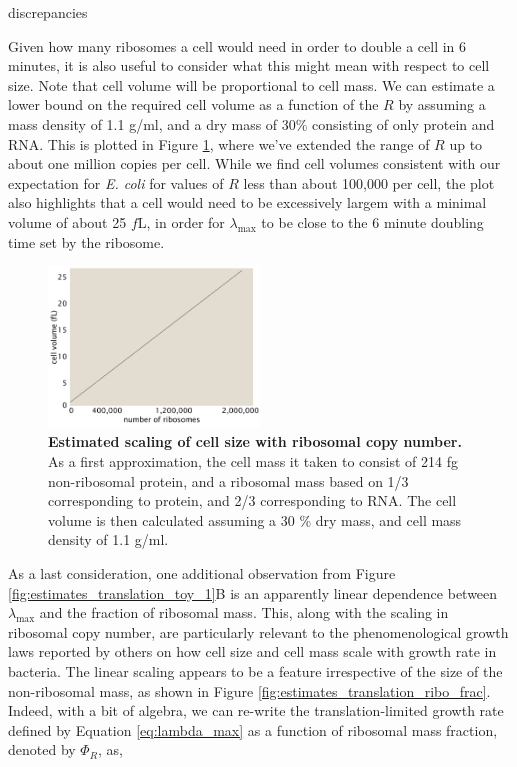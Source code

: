 discrepancies \documentclass[11pt, letterpaper]{article}
\begin{document}
Given how many ribosomes a cell would need in order to double a cell in 6 minutes,
it is also useful to consider what this might mean with
respect to cell size. Note that cell volume will be proportional to cell mass.
We can estimate a lower bound on the required cell volume as a function of the
$R$ by assuming a mass density of 1.1 g/ml, and a dry mass of 30\% consisting of
only protein and RNA. This is plotted in Figure
\ref{fig:estimates_translation_volume}, where we've extended the range of $R$ up
to about one million copies per cell. While we find cell volumes consistent with our expectation for {\it E. coli}
for values of $R$ less than about 100,000 per cell, the plot also highlights that a cell would need to be
excessively largem with a minimal volume of about 25 $f$L, in order for
$\lambda_{\text{max}}$ to be close to the 6 minute doubling time set by the ribosome.

\begin{figure}[H]
		\centering
    \includegraphics[width=0.5\textwidth]{../../code/figures/SI/estimates_translation_volume.pdf}
  \caption{{\bf Estimated scaling of cell size with ribosomal copy number.} As a first approximation,
	the cell mass it taken to consist of 214 fg non-ribosomal protein, and a ribosomal mass based
	on 1/3 corresponding to protein, and 2/3 corresponding to RNA. The cell volume is then calculated assuming
	a 30 \% dry mass, and cell mass density of 1.1 g/ml. }
  \label{fig:estimates_translation_volume}
\end{figure}

As a last consideration, one additional observation from Figure \ref{fig:estimates_translation_toy_1}B
is an apparently linear dependence
between $\lambda_{\text{max}}$  and the fraction of ribosomal mass. This, along with the
scaling in ribosomal copy number, are particularly relevant to the
phenomenological growth laws reported by others on how cell size and cell mass
scale with growth rate in bacteria. The linear scaling appears to be a feature
irrespective of the size of the non-ribosomal mass, as shown in Figure
\ref{fig:estimates_translation_ribo_frac}. Indeed, with a bit of algebra, we can
re-write the translation-limited growth rate defined by Equation
\ref{eq:lambda_max} as a function of ribosomal mass fraction, denoted by
$\Phi_R$, as,
\end{document}
